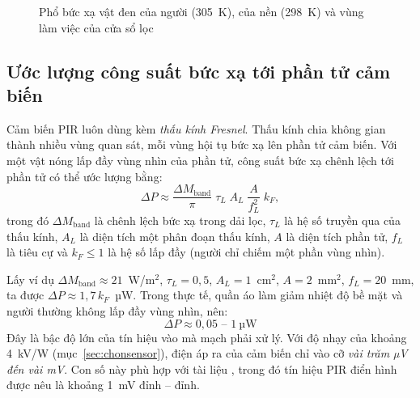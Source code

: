 \begin{figure}[!htb]
\centering
{}
\caption{Phổ bức xạ vật đen của người (305~K), của nền (298~K) và vùng làm việc của cửa sổ lọc}
\label{fig:planck}
\end{figure}

\subsection{Ước lượng công suất bức xạ tới phần tử cảm biến}
\label{sec:uocluongP}

Cảm biến PIR luôn dùng kèm \emph{thấu kính Fresnel}. Thấu kính chia không gian thành nhiều vùng quan sát, mỗi vùng hội tụ bức xạ lên phần tử cảm biến. Với một vật nóng lấp đầy vùng nhìn của phần tử, công suất bức xạ chênh lệch tới phần tử có thể ước lượng bằng:
\begin{equation}
  \Delta P \approx \frac{\Delta M_\text{band}}{\pi}\;\tau_L\;A_L\;\frac{A}{f_L^2}\;k_F,
  \label{eq:deltaP}
\end{equation}
trong đó $\Delta M_\text{band}$ là chênh lệch bức xạ trong dải lọc, $\tau_L$ là hệ số truyền qua của thấu kính, $A_L$ là diện tích một phân đoạn thấu kính, $A$ là diện tích phần tử, $f_L$ là tiêu cự và $k_F \le 1$ là hệ số lấp đầy (người chỉ chiếm một phần vùng nhìn).

Lấy ví dụ $\Delta M_\text{band} \approx 21$~W/m$^2$, $\tau_L = 0{,}5$, $A_L = 1$~cm$^2$, $A = 2$~mm$^2$, $f_L = 20$~mm, ta được $\Delta P \approx 1{,}7\,k_F$~µW. Trong thực tế, quần áo làm giảm nhiệt độ bề mặt và người thường không lấp đầy vùng nhìn, nên:
\begin{equation*}
  \boxed{\Delta P \approx 0{,}05 \text{ -- } 1~\text{µW}}
\end{equation*}
Đây là bậc độ lớn của tín hiệu vào mà mạch phải xử lý. Với độ nhạy của \PYD{} khoảng 4~kV/W (mục~\ref{sec:chonsensor}), điện áp ra của cảm biến chỉ vào cỡ \emph{vài trăm µV đến vài mV}. Con số này phù hợp với tài liệu \cite{st-an4368}, trong đó tín hiệu PIR điển hình được nêu là khoảng 1~mV đỉnh -- đỉnh.

